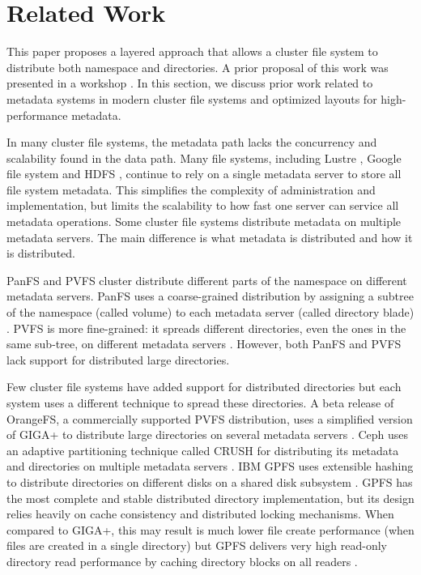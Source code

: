 \section{Related Work}
\label{relatedwork}

This paper proposes a layered approach that allows a cluster file system to
distribute both namespace and directories. A prior proposal of this work
was presented in a workshop \cite{gigapdsw}.
In this section, we discuss prior work related to metadata systems
in modern cluster file systems and optimized layouts for high-performance metadata.

In many cluster file systems, the metadata path lacks the concurrency and 
scalability found in the data path.
Many file systems, including Lustre \cite{lustre}, Google file system
\cite{gfs:ghemawat03} and HDFS \cite{HDFS}, continue to rely on a single
metadata server to store all file system metadata. This simplifies the
complexity of administration and implementation, but limits the scalability to 
how fast one server can service all metadata operations. 
Some cluster file systems distribute metadata on multiple metadata servers. The 
main difference is what metadata is distributed and how it is distributed.

PanFS and PVFS cluster distribute different parts of the namespace on different
metadata servers.
PanFS uses a coarse-grained distribution by assigning a subtree of the
namespace (called volume) to each metadata server (called directory blade) 
\cite{PanFS}.
PVFS is more fine-grained: it spreads different directories, even the ones in
the same sub-tree, on different metadata servers \cite{pvfs}.
However, both PanFS and PVFS lack support for distributed large directories.

Few cluster file systems have added support for distributed directories but
each system uses a different technique to spread these directories.
A beta release of OrangeFS, a commercially supported PVFS distribution, uses a 
simplified version of GIGA+ to distribute large directories on several metadata 
servers \cite{OrangeFS}.
Ceph uses an adaptive partitioning technique called CRUSH for distributing its
metadata and directories on multiple metadata servers \cite{ceph:weil06}.
IBM GPFS uses extensible hashing to distribute directories on different disks on 
a shared disk subsystem \cite{gpfs:schmuck02}. GPFS has the most complete and
stable distributed directory implementation, but its design relies heavily on
cache consistency and distributed locking mechanisms. When compared to GIGA+,
this may result is much lower file create performance (when files are created
in a single directory) but GPFS delivers very high read-only directory read performance 
by caching directory blocks on all readers \cite{GIGA11}.

